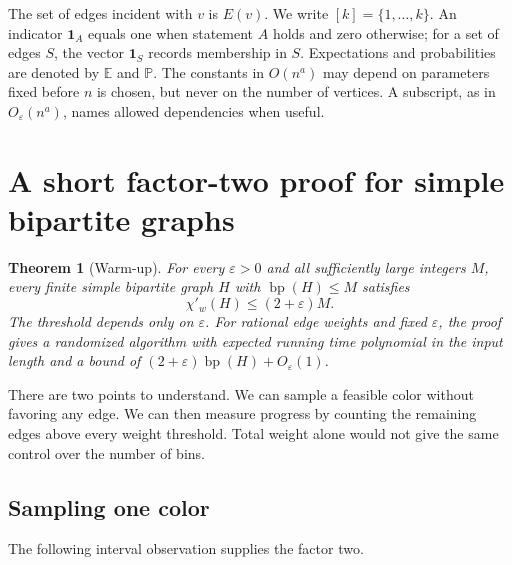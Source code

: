 \documentclass[11pt]{article}
\newtheorem{theorem}{Theorem}[section]
\theoremstyle{definition}\newtheorem{algorithm}{Algorithm}[section]
\numberwithin{equation}{section}
\theoremstyle{remark}\newtheorem*{remark}{Remark}
\newcommand{\E}{\mathbb E}
\newcommand{\Prb}{\mathbb P}
\newcommand{\one}{\mathbf 1}
\newcommand{\eps}{\varepsilon}
\begin{document}
The set of edges incident with $v$ is $E(v)$. We write $[k]=\{1,\ldots,k\}$.
An indicator $\one_A$ equals one when statement $A$ holds and zero otherwise;
for a set of edges $S$, the vector $\one_S$ records membership in $S$.
Expectations and probabilities are denoted by $\E$ and $\Prb$.
The constants in $O(n^a)$ may depend on parameters fixed before $n$ is
chosen, but never on the number of vertices. A subscript, as in
$O_\eps(n^a)$, names allowed dependencies when useful.

\section{A short factor-two proof for simple bipartite graphs}
\label{sec:warmup}

\begin{theorem}[Warm-up]\label{thm:warmup}
For every $\varepsilon>0$ and all sufficiently large integers $M$,
every finite simple bipartite graph $H$ with $\operatorname{bp}(H)\le M$
satisfies
\[
 \chi'_w(H)\le(2+\varepsilon)M.
\]
The threshold depends only on $\varepsilon$.
For rational edge weights and fixed $\varepsilon$, the proof gives a
randomized algorithm with expected running time polynomial in the input
length and a bound of $(2+\varepsilon)\operatorname{bp}(H)+O_\varepsilon(1)$.
\end{theorem}

There are two points to understand. We can sample a feasible color
without favoring any edge. We can then measure progress by counting the
remaining edges above every weight threshold. Total weight alone would
not give the same control over the number of bins.

\subsection{Sampling one color}
The following interval observation supplies the factor two.
\end{document}
